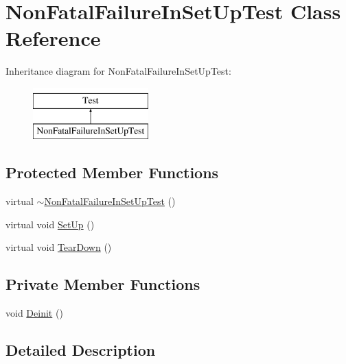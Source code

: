\hypertarget{classNonFatalFailureInSetUpTest}{\section{\-Non\-Fatal\-Failure\-In\-Set\-Up\-Test \-Class \-Reference}
\label{db/dfa/classNonFatalFailureInSetUpTest}
}
\-Inheritance diagram for \-Non\-Fatal\-Failure\-In\-Set\-Up\-Test\-:\begin{figure}[H]
\begin{center}
\leavevmode
\includegraphics[height=2.000000cm]{db/dfa/classNonFatalFailureInSetUpTest}
\end{center}
\end{figure}
\subsection*{\-Protected \-Member \-Functions}
\begin{DoxyCompactItemize}
\item 
virtual \hyperlink{classNonFatalFailureInSetUpTest_ad55c80b9eba395a9b7ea540d0321b963}{$\sim$\-Non\-Fatal\-Failure\-In\-Set\-Up\-Test} ()
\item 
virtual void \hyperlink{classNonFatalFailureInSetUpTest_a901706a587f9ae84df8b2395fbe759cb}{\-Set\-Up} ()
\item 
virtual void \hyperlink{classNonFatalFailureInSetUpTest_a870a092058305911f3d42df45dd657e5}{\-Tear\-Down} ()
\end{DoxyCompactItemize}
\subsection*{\-Private \-Member \-Functions}
\begin{DoxyCompactItemize}
\item 
void \hyperlink{classNonFatalFailureInSetUpTest_a9f9d89fef9cb9c06f25222102d276470}{\-Deinit} ()
\end{DoxyCompactItemize}


\subsection{\-Detailed \-Description}


